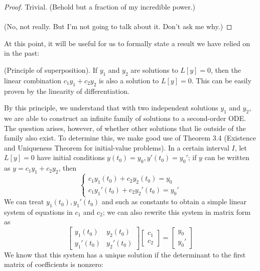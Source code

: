 \documentclass{article}
\begin{document}
\begin{proof}
    Trivial. (Behold but a fraction of my incredible power.) \\ \\
    (No, not really. But I'm not going to talk about it. Don't ask me why.)
\end{proof}
At this point, it will be useful for us to formally state a result we have relied on in the past:
\begin{principle}
    (Principle of superposition). If $y_1$ and $y_2$ are solutions to $L[y] = 0$, then the linear combination $c_1 y_1 + c_2 y_2$ is also a solution to $L[y] = 0$. This can be easily proven by the linearity of differentiation.
\end{principle}
By this principle, we understand that with two independent solutions $y_1$ and $y_2$, we are able to construct an infinite family of solutions to a second-order ODE. The question arises, however, of whether other solutions that lie outside of the family also exist. To determine this, we make good use of Theorem 3.4 (Existence and Uniqueness Theorem for initial-value problems). In a certain interval $I$, let $L[y] =0$ have initial conditions $y(t_0) = y_0, y'(t_0) = y_0'$; if $y$ can be written as $y=c_1 y_1 + c_2 y_2$, then
\begin{equation*}
    \begin{cases}
        c_1y_1(t_0) + c_2y_2(t_0) = y_0 \\
        c_1y_1'(t_0) + c_2y_2'(t_0) = y_0'
    \end{cases}
\end{equation*}
We can treat $y_1(t_0), y_1'(t_0)$ and such as constants to obtain a simple linear system of equations in $c_1$ and $c_2$; we can also rewrite this system in matrix form as
\begin{equation*}
    \begin{bmatrix}
        y_1(t_0) & y_2(t_0) \\
        y_1'(t_0) & y_2'(t_0) 
    \end{bmatrix}
    \begin{bmatrix}
        c_1 \\
        c_2
    \end{bmatrix}
    =
    \begin{bmatrix}
        y_0 \\
        y_0'
    \end{bmatrix}
\end{equation*}
We know that this system has a unique solution if the determinant to the first matrix of coefficients is nonzero:
\end{document}
